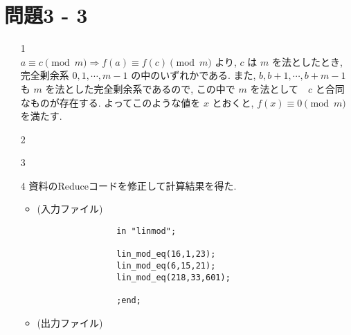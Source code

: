 \documentclass[12pt,a4paper]{jsarticle}
\begin{document}
\section*{問題3 - 3}
\begin{enumerate}
 \item[1]  \mbox{} \\
	$a \equiv c \pmod{m} \Rightarrow f(a) \equiv f(c) \pmod{m}$
	より, $c$ は $m$ を法としたとき, 完全剰余系 $0, 1, \cdots , m-1$ の中のいずれかである. 		また, $b, b+1, \cdots, b+m-1$ も $m$ を法とした完全剰余系であるので, この中で $m$ を法として　$c$ と合同なものが存在する. よってこのような値を $x$ とおくと, $f(x) \equiv 0 \pmod{m}$ を満たす. 
 \item[2]  \mbox{} \\
 \item[3]  \mbox{} \\
 \item[4]  資料のReduceコードを修正して計算結果を得た. \\
	\begin{itemize}
		\item (入力ファイル)
			\begin{verbatim}
				in "linmod";

				lin_mod_eq(16,1,23);
				lin_mod_eq(6,15,21);
				lin_mod_eq(218,33,601);

				;end;
			\end{verbatim}
		\item (出力ファイル)
			\begin{verbatim}


\end{verbatim}
\end{itemize}
\end{enumerate}
\end{document}
